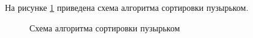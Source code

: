 На рисунке \ref{fig:bubble} приведена схема алгоритма сортировки пузырьком.

\begin{figure}[h!]
	
	
	\caption{Схема алгоритма сортировки пузырьком}
	
	\label{fig:bubble}
	
\end{figure}


